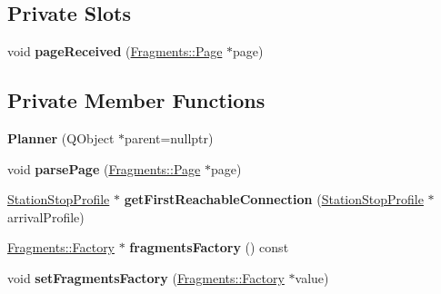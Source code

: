\subsection*{Private Slots}
\begin{DoxyCompactItemize}
\item 
\mbox{\label{classRouterEngine_1_1Planner_afadfcb054f08ac1b338e143e7a84cc95}} 
void {\bfseries page\+Received} (\mbox{\hyperlink{classFragments_1_1Page}{Fragments\+::\+Page}} $\ast$page)
\end{DoxyCompactItemize}
\subsection*{Private Member Functions}
\begin{DoxyCompactItemize}
\item 
\mbox{\label{classRouterEngine_1_1Planner_a8bf6486e4b0d55b3aa7433b147bda6b6}} 
{\bfseries Planner} (Q\+Object $\ast$parent=nullptr)
\item 
\mbox{\label{classRouterEngine_1_1Planner_a582610961b633f5787084f8a666b6e37}} 
void {\bfseries parse\+Page} (\mbox{\hyperlink{classFragments_1_1Page}{Fragments\+::\+Page}} $\ast$page)
\item 
\mbox{\label{classRouterEngine_1_1Planner_a68a39695218135f3270680c4870fb4fa}} 
\mbox{\hyperlink{classRouterEngine_1_1StationStopProfile}{Station\+Stop\+Profile}} $\ast$ {\bfseries get\+First\+Reachable\+Connection} (\mbox{\hyperlink{classRouterEngine_1_1StationStopProfile}{Station\+Stop\+Profile}} $\ast$arrival\+Profile)
\item 
\mbox{\label{classRouterEngine_1_1Planner_a9e97d9af0619e8ee39d94ab5ce23971b}} 
\mbox{\hyperlink{classFragments_1_1Factory}{Fragments\+::\+Factory}} $\ast$ {\bfseries fragments\+Factory} () const
\item 
\mbox{\label{classRouterEngine_1_1Planner_a5eda6f379ae74d0be89eb80507cab31e}} 
void {\bfseries set\+Fragments\+Factory} (\mbox{\hyperlink{classFragments_1_1Factory}{Fragments\+::\+Factory}} $\ast$value)
\item 
\mbox{\label{classRouterEngine_1_1Planner_af2e50833a9f093a2a6e7cabea054cdd5}} 

\end{DoxyCompactItemize}
